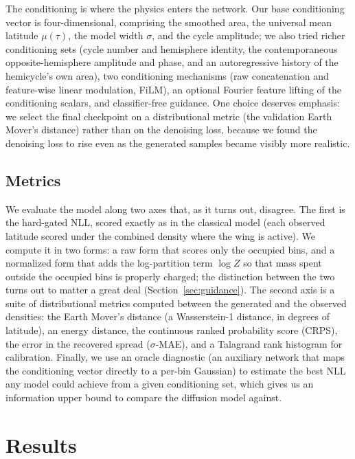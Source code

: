 \documentclass[twocolumn]{aastex631}
\begin{document}
The conditioning is where the physics enters the network. Our base conditioning
vector is four-dimensional, comprising the smoothed area, the universal mean
latitude $\mu(\tau)$, the model width $\sigma$, and the cycle amplitude; we also
tried richer conditioning sets (cycle number and hemisphere identity, the
contemporaneous opposite-hemisphere amplitude and phase, and an autoregressive
history of the hemicycle's own area), two conditioning mechanisms (raw
concatenation and feature-wise linear modulation, FiLM), an optional Fourier
feature lifting of the conditioning scalars, and classifier-free guidance. One
choice deserves emphasis: we select the final checkpoint on a distributional
metric (the validation Earth Mover's distance) rather than on the denoising
loss, because we found the denoising loss to rise even as the generated samples
became visibly more realistic.

\subsection{Metrics}
\label{sec:metrics}

We evaluate the model along two axes that, as it turns out, disagree. The first
is the hard-gated NLL, scored exactly as in the classical model (each observed
latitude scored under the combined density where the wing is active). We compute
it in two forms: a raw form that scores only the occupied bins, and a normalized
form that adds the log-partition term $\log Z$ so that mass spent outside the
occupied bins is properly charged; the distinction between the two turns out to
matter a great deal (Section~\ref{sec:guidance}). The second axis is a suite of
distributional metrics computed between the generated and the observed densities:
the Earth Mover's distance (a Wasserstein-1 distance, in degrees of latitude),
an energy distance, the continuous ranked probability score (CRPS), the error in
the recovered spread ($\sigma$-MAE), and a Talagrand rank histogram for
calibration. Finally, we use an oracle diagnostic (an auxiliary network that maps
the conditioning vector directly to a per-bin Gaussian) to estimate the best
NLL any model could achieve from a given conditioning set, which gives us an
information upper bound to compare the diffusion model against.

\section{Results}
\label{sec:results}
\end{document}
